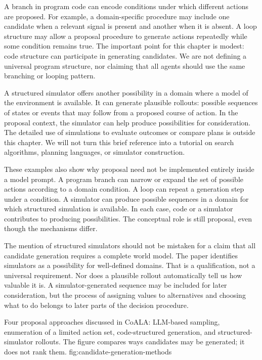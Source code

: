 A branch in program code can encode conditions under which different actions are proposed. For example, a domain-specific procedure may include one candidate when a relevant signal is present and another when it is absent. A loop structure may allow a proposal procedure to generate actions repeatedly while some condition remains true. The important point for this chapter is modest: code structure can participate in generating candidates. We are not defining a universal program structure, nor claiming that all agents should use the same branching or looping pattern.

A structured simulator offers another possibility in a domain where a model of the environment is available. It can generate plausible rollouts: possible sequences of states or events that may follow from a proposed course of action. In the proposal context, the simulator can help produce possibilities for consideration. The detailed use of simulations to evaluate outcomes or compare plans is outside this chapter. We will not turn this brief reference into a tutorial on search algorithms, planning languages, or simulator construction.


These examples also show why proposal need not be implemented entirely inside a model prompt. A program branch can narrow or expand the set of possible actions according to a domain condition. A loop can repeat a generation step under a condition. A simulator can produce possible sequences in a domain for which structured simulation is available. In each case, code or a simulator contributes to producing possibilities. The conceptual role is still proposal, even though the mechanisms differ.

The mention of structured simulators should not be mistaken for a claim that all candidate generation requires a complete world model. The paper identifies simulators as a possibility for well-defined domains. That is a qualification, not a universal requirement. Nor does a plausible rollout automatically tell us how valuable it is. A simulator-generated sequence may be included for later consideration, but the process of assigning values to alternatives and choosing what to do belongs to later parts of the decision procedure.

  {Four proposal approaches discussed in CoALA: LLM-based sampling, enumeration of a limited action set, code-structured generation, and structured-simulator rollouts. The figure compares ways candidates may be generated; it does not rank them.}
  {fig:candidate-generation-methods}


